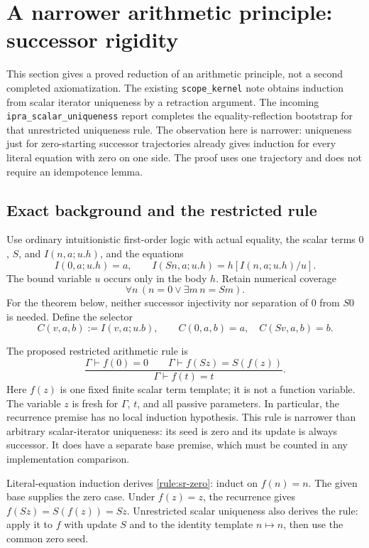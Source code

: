 \section{A narrower arithmetic principle: successor rigidity}
\label{sec:successor-rigidity}

This section gives a proved reduction of an arithmetic principle, not
a second completed axiomatization.  The existing
\texttt{scope\_kernel} note obtains induction from scalar iterator
uniqueness by a retraction argument.  The incoming
\texttt{ipra\_scalar\_uniqueness} report completes the equality-reflection
bootstrap for that unrestricted uniqueness rule.  The observation here
is narrower: uniqueness just for zero-starting successor trajectories
already gives induction for every literal equation with zero on one side.
The proof uses one trajectory and does not require an idempotence lemma.

\subsection{Exact background and the restricted rule}

Use ordinary intuitionistic first-order logic with actual equality,
the scalar terms $0$, $S$, and $I(n,a;u.h)$, and the equations
\[
 I(0,a;u.h)=a,\qquad
 I(Sn,a;u.h)=h[I(n,a;u.h)/u].
\]
The bound variable $u$ occurs only in the body $h$.  Retain numerical
coverage
\[
                 \forall n\,(n=0\lor\exists m\,n=Sm).
\]
For the theorem below, neither successor injectivity nor separation of
$0$ from $S0$ is needed.  Define the selector
\[
 C(v,a,b):=I(v,a;u.b),\qquad
 C(0,a,b)=a,\quad C(Sv,a,b)=b.
\]

The proposed restricted arithmetic rule is
\[
 \frac{\Gamma\vdash f(0)=0\qquad
       \Gamma\vdash f(Sz)=S(f(z))}
      {\Gamma\vdash f(t)=t}.
 \tag{SR$_0$}\label{rule:sr-zero}
\]
Here $f(z)$ is one fixed finite scalar term template; it is not a
function variable.  The variable $z$ is fresh for $\Gamma$, $t$, and
all passive parameters.  In particular, the recurrence premise has
no local induction hypothesis.  This rule is narrower than arbitrary
scalar-iterator uniqueness: its seed is zero and its update is always
successor.  It does have a separate base premise, which must be counted
in any implementation comparison.

Literal-equation induction derives \eqref{rule:sr-zero}: induct on
$f(n)=n$.  The given base supplies the zero case.  Under $f(z)=z$,
the recurrence gives
$f(Sz)=S(f(z))=Sz$.  Unrestricted scalar uniqueness also derives the
rule: apply it to $f$ with update $S$ and to the identity template
$n\mapsto n$, then use the common zero seed.

